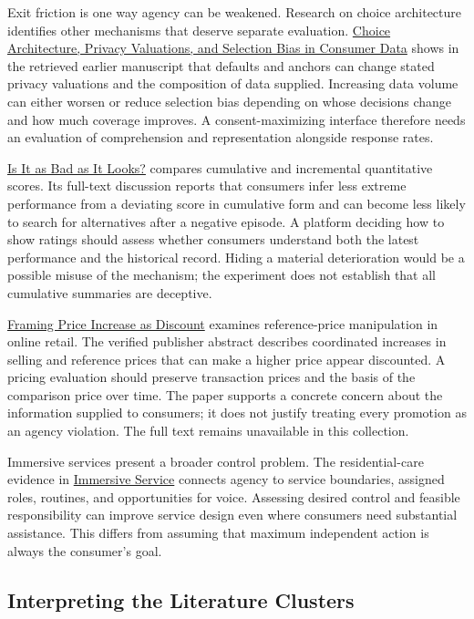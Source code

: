 \noindent \noindent Exit friction is one way agency can be weakened. Research on
choice architecture identifies other mechanisms that deserve separate
evaluation. \href{https://doi.org/10.1287/mksc.2023.0373}{Choice
Architecture, Privacy Valuations, and Selection Bias in Consumer Data}
shows in the retrieved earlier manuscript that defaults and anchors can
change stated privacy valuations and the composition of data supplied.
Increasing data volume can either worsen or reduce selection bias
depending on whose decisions change and how much coverage improves. A
consent-maximizing interface therefore needs an evaluation of
comprehension and representation alongside response rates.

\href{https://doi.org/10.1177/00222437231193343}{Is It as Bad as It
Looks?} compares cumulative and incremental quantitative scores. Its
full-text discussion reports that consumers infer less extreme
performance from a deviating score in cumulative form and can become
less likely to search for alternatives after a negative episode. A
platform deciding how to show ratings should assess whether consumers
understand both the latest performance and the historical record. Hiding
a material deterioration would be a possible misuse of the mechanism;
the experiment does not establish that all cumulative summaries are
deceptive.

\href{https://doi.org/10.1287/mksc.2022.1402}{Framing Price Increase as
Discount} examines reference-price manipulation in online retail. The
verified publisher abstract describes coordinated increases in selling
and reference prices that can make a higher price appear discounted. A
pricing evaluation should preserve transaction prices and the basis of
the comparison price over time. The paper supports a concrete concern
about the information supplied to consumers; it does not justify
treating every promotion as an agency violation. The full text remains
unavailable in this collection.

Immersive services present a broader control problem. The
residential-care evidence in
\href{https://doi.org/10.1177/00222429251319312}{Immersive Service}
connects agency to service boundaries, assigned roles, routines, and
opportunities for voice. Assessing desired control and feasible
responsibility can improve service design even where consumers need
substantial assistance. This differs from assuming that maximum
independent action is always the consumer's goal.

\hypertarget{M08-interpreting-the-literature-clusters}{%
\subsection{Interpreting the Literature
Clusters}\label{M08-interpreting-the-literature-clusters}}

